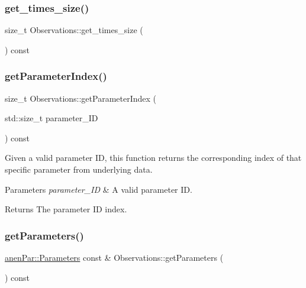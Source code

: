 \mbox{\label{class_observations_a352e34f7c278c86f54c69def24dabcd1}} 
\subsubsection{\texorpdfstring{get\+\_\+times\+\_\+size()}{get\_times\_size()}}
{\footnotesize\ttfamily size\+\_\+t Observations\+::get\+\_\+times\+\_\+size (\begin{DoxyParamCaption}{ }\end{DoxyParamCaption}) const}

\mbox{\label{class_observations_a73897578d7e1d4aaf6023857db896ee8}} 
\subsubsection{\texorpdfstring{get\+Parameter\+Index()}{getParameterIndex()}}
{\footnotesize\ttfamily size\+\_\+t Observations\+::get\+Parameter\+Index (\begin{DoxyParamCaption}\item[{std\+::size\+\_\+t}]{parameter\+\_\+\+ID }\end{DoxyParamCaption}) const}

Given a valid parameter ID, this function returns the corresponding index of that specific parameter from underlying data.


\begin{DoxyParams}{Parameters}
{\em parameter\+\_\+\+ID} & A valid parameter ID. \\
\hline
\end{DoxyParams}
\begin{DoxyReturn}{Returns}
The parameter ID index. 
\end{DoxyReturn}
\mbox{\label{class_observations_a5347196195a72495217dc0614c9224c2}} 
\subsubsection{\texorpdfstring{get\+Parameters()}{getParameters()}}
{\footnotesize\ttfamily \mbox{\hyperlink{classanen_par_1_1_parameters}{anen\+Par\+::\+Parameters}} const  \& Observations\+::get\+Parameters (\begin{DoxyParamCaption}{ }\end{DoxyParamCaption}) const}

